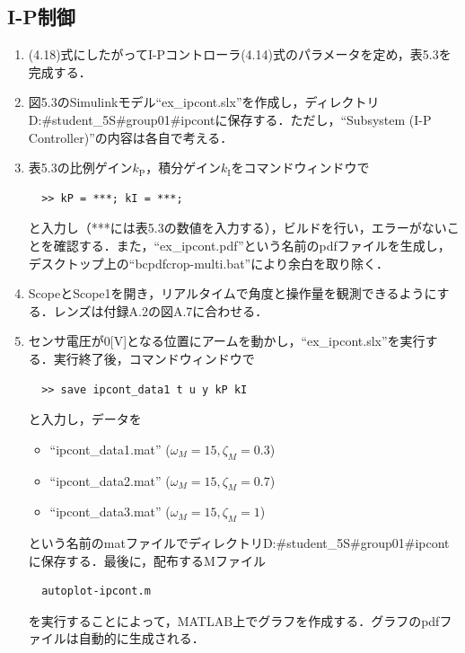 \subsection{I-P制御}
\begin{enumerate}
  \item (4.18)式にしたがってI-Pコントローラ(4.14)式のパラメータを定め，表5.3を完成する．
  \item 図5.3のSimulinkモデル“ex\_ipcont.slx”を作成し，ディレクトリD:\#student\_5S\#group01\#ipcontに保存する．ただし，“Subsystem (I-P Controller)”の内容は各自で考える．
  \item 表5.3の比例ゲイン$k_{\mathrm{P}}$，積分ゲイン$k_{\mathrm{I}}$をコマンドウィンドウで
        \begin{verbatim}
  >> kP = ***; kI = ***;
  \end{verbatim}
        と入力し（***には表5.3の数値を入力する），ビルドを行い，エラーがないことを確認する．また，“ex\_ipcont.pdf”という名前のpdfファイルを生成し，デスクトップ上の“bcpdfcrop-multi.bat”により余白を取り除く．
        
  \item ScopeとScope1を開き，リアルタイムで角度と操作量を観測できるようにする．レンズは付録A.2の図A.7に合わせる．
        
  \item センサ電圧が0[V]となる位置にアームを動かし，“ex\_ipcont.slx”を実行する．実行終了後，コマンドウィンドウで
        \begin{verbatim}
  >> save ipcont_data1 t u y kP kI
  \end{verbatim}
        と入力し，データを
        \begin{itemize}
          \item “ipcont\_data1.mat” ($\omega_M = 15, \zeta_M = 0.3$)
          \item “ipcont\_data2.mat” ($\omega_M = 15, \zeta_M = 0.7$)
          \item “ipcont\_data3.mat” ($\omega_M = 15, \zeta_M = 1$)
        \end{itemize}
        という名前のmatファイルでディレクトリD:\#student\_5S\#group01\#ipcontに保存する．最後に，配布するMファイル
        \begin{verbatim}
  autoplot-ipcont.m
  \end{verbatim}
        を実行することによって，MATLAB上でグラフを作成する．グラフのpdfファイルは自動的に生成される．
        
\end{enumerate}

